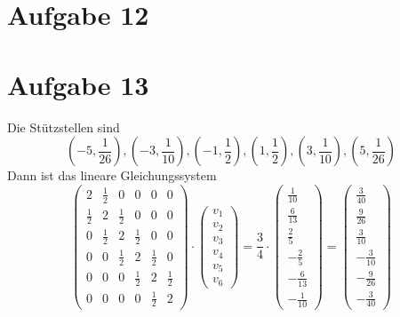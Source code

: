 \documentclass[10pt,a4paper]{article}
\begin{document}
\section{Aufgabe 12}

\section{Aufgabe 13}

Die Stützstellen sind
\begin{equation}
  (-5, \frac{1}{26}), (-3, \frac{1}{10}), (-1, \frac{1}{2}), (1, \frac{1}{2}), (3, \frac{1}{10}), (5, \frac{1}{26})
\end{equation}
Dann ist das lineare Gleichungssystem
\begin{equation}
  \begin{pmatrix}
    2 & \frac{1}{2} & 0 & 0 & 0 & 0\\
    \frac{1}{2} & 2 & \frac{1}{2} & 0 & 0 & 0\\
    0 & \frac{1}{2} & 2 & \frac{1}{2} & 0 & 0\\
    0 & 0 & \frac{1}{2} & 2 & \frac{1}{2} & 0\\
    0 & 0 & 0 & \frac{1}{2} & 2 & \frac{1}{2}\\
    0 & 0 & 0 & 0 & \frac{1}{2} & 2
  \end{pmatrix}
  \cdot
  \begin{pmatrix}
    v_{1}\\
    v_{2}\\
    v_{3}\\
    v_{4}\\
    v_{5}\\
    v_{6}
  \end{pmatrix}
  =
  \frac{3}{4} \cdot
  \begin{pmatrix}
    \frac{1}{10}\\
    \frac{6}{13}\\
    \frac{2}{5}\\
    -\frac{2}{5}\\
    -\frac{6}{13}\\
    -\frac{1}{10}
  \end{pmatrix}
  =
  \begin{pmatrix}
    \frac{3}{40}\\
    \frac{9}{26}\\
    \frac{3}{10}\\
    -\frac{3}{10}\\
    -\frac{9}{26}\\
    -\frac{3}{40}
  \end{pmatrix}
\end{equation}
\end{document}
